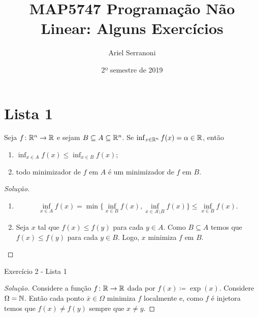 \documentclass[12pt,twoside,a4paper]{article}
\title{MAP5747 Programação Não Linear: Alguns Exercícios}
\author{Ariel Serranoni}
\date{2º semestre de 2019}
\begin{document}
\maketitle

\section{Lista 1}
\begin{problema}
  Seja \(f\colon\mathbb{R}^n\to\mathbb{R}\) e sejam
  \(B\subseteq A\subseteq\mathbb{R}^n\). Se
 \(\inf_{x\in\mathbb{R}^n}f(x)=\alpha\in\mathbb{R}\), então
\begin{enumerate}[label=(\roman*)]
\item \(\inf_{x\in A}f(x)\leq\inf_{x\in B}f(x)\);
\item todo minimizador de \(f\) em \(A\) é um minimizador de \(f\)
  em \(B\).
\end{enumerate}
\end{problema}
\begin{proof}[Solução]\hfill
  \begin{enumerate}[label=(\roman*)]
  \item \[\inf_{x\in A} f(x)=
      \min\{\inf_{x\in B}f(x), \inf_{x\in A\setminus B}f(x)\}\leq
      \inf_{x\in B}f(x).\]
  \item Seja \(x\) tal que \(f(x)\leq f(y)\) para cada \(y\in A\). Como
    \(B\subseteq A\) temos que \(f(x)\leq f(y)\) para cada \(y\in B\).
    Logo,
    \(x\) minimiza \(f\) em \(B\).\qedhere
    \end{enumerate}
\end{proof}

\begin{problema}
Exercício 2 - Lista 1
\end{problema}
\begin{proof}[Solução]
  Considere a função \(f\colon\mathbb{R}\to\mathbb{R}\) dada por
  \(f(x)\coloneqq\exp(x)\). Considere \(\Omega=\mathbb{N}\).
  Então cada ponto \(\bar{x}\in\Omega\) minimiza \(f\) localmente e,
  como \(f\) é injetora temos que \(f(x)\not=f(y)\)
  sempre que \(x\not= y\).\qedhere
\end{proof}
\end{document}
